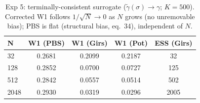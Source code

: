 \begin{table}[ht]
\centering
\caption{Exp 5: terminally-consistent surrogate ($\tilde\gamma(\sigma)\to\gamma$; $K=500$). Corrected W1 follows $1/\sqrt{N}\to 0$ as $N$ grows (no unremovable bias); PBS is flat (structural bias, eq.~34), independent of $N$.}
\label{tab:toy_5}
\begin{tabular}{lcccc}
\toprule
N & W1 (PBS) & W1 (Girs) & W1 (Pot) & ESS (Girs) \\
\midrule
32 & 0.2681 & 0.2099 & 0.2187 & 32 \\
128 & 0.2852 & 0.0700 & 0.0727 & 125 \\
512 & 0.2842 & 0.0557 & 0.0514 & 502 \\
2048 & 0.2930 & 0.0319 & 0.0296 & 2005 \\
\bottomrule
\end{tabular}
\end{table}
